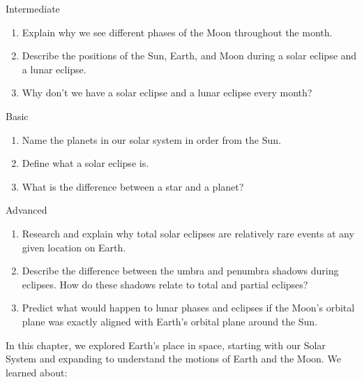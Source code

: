\begin{tieredquestions}{Intermediate}
\begin{enumerate}
    \item Explain why we see different phases of the Moon throughout the month.
    \item Describe the positions of the Sun, Earth, and Moon during a solar eclipse and a lunar eclipse.
    \item Why don't we have a solar eclipse and a lunar eclipse every month?
\end{enumerate}
\begin{tieredquestions}{Basic}
\begin{enumerate}
    \item Name the planets in our solar system in order from the Sun.
    \item Define what a solar eclipse is.
    \item What is the difference between a star and a planet?
\end{enumerate}
\end{tieredquestions}

\begin{tieredquestions}{Advanced}
\begin{enumerate}
    \item Research and explain why total solar eclipses are relatively rare events at any given location on Earth.
    \item Describe the difference between the umbra and penumbra shadows during eclipses. How do these shadows relate to total and partial eclipses?
    \item  Predict what would happen to lunar phases and eclipses if the Moon's orbital plane was exactly aligned with Earth's orbital plane around the Sun.
\end{enumerate}
\end{tieredquestions}


\FloatBarrier

In this chapter, we explored Earth's place in space, starting with our Solar System and expanding to understand the motions of Earth and the Moon. We learned about:


\end{tieredquestions}
